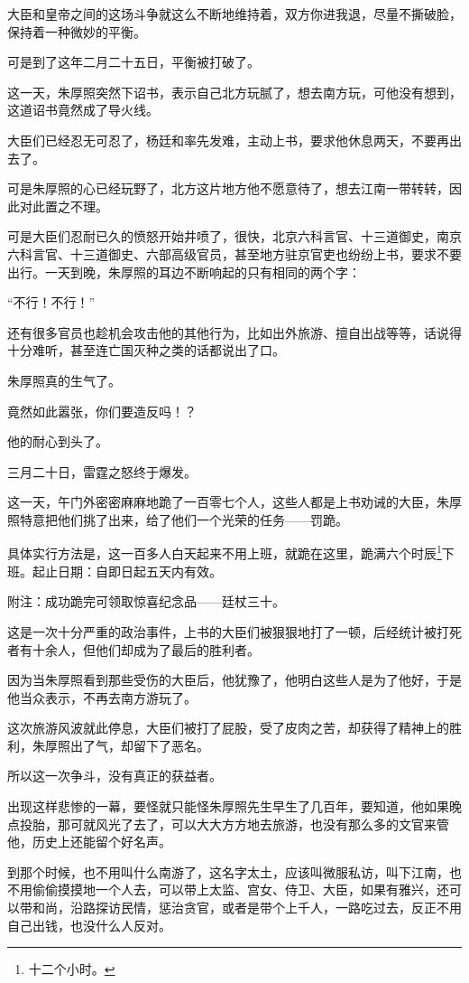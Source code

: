 \begin{multicols}{\theparacolNo}
大臣和皇帝之间的这场斗争就这么不断地维持着，双方你进我退，尽量不撕破脸，保持着一种微妙的平衡。

可是到了这年二月二十五日，平衡被打破了。

这一天，朱厚照突然下诏书，表示自己北方玩腻了，想去南方玩，可他没有想到，这道诏书竟然成了导火线。

大臣们已经忍无可忍了，杨廷和率先发难，主动上书，要求他休息两天，不要再出去了。

可是朱厚照的心已经玩野了，北方这片地方他不愿意待了，想去江南一带转转，因此对此置之不理。

可是大臣们忍耐已久的愤怒开始井喷了，很快，北京六科言官、十三道御史，南京六科言官、十三道御史、六部高级官员，甚至地方驻京官吏也纷纷上书，要求不要出行。一天到晚，朱厚照的耳边不断响起的只有相同的两个字：

“不行！不行！”

还有很多官员也趁机会攻击他的其他行为，比如出外旅游、擅自出战等等，话说得十分难听，甚至连亡国灭种之类的话都说出了口。

朱厚照真的生气了。

竟然如此嚣张，你们要造反吗！？

他的耐心到头了。

三月二十日，雷霆之怒终于爆发。

这一天，午门外密密麻麻地跪了一百零七个人，这些人都是上书劝诫的大臣，朱厚照特意把他们挑了出来，给了他们一个光荣的任务——罚跪。

具体实行方法是，这一百多人白天起来不用上班，就跪在这里，跪满六个时辰\footnote{十二个小时。}下班。起止日期：自即日起五天内有效。

附注：成功跪完可领取惊喜纪念品——廷杖三十。

这是一次十分严重的政治事件，上书的大臣们被狠狠地打了一顿，后经统计被打死者有十余人，但他们却成为了最后的胜利者。

因为当朱厚照看到那些受伤的大臣后，他犹豫了，他明白这些人是为了他好，于是他当众表示，不再去南方游玩了。

这次旅游风波就此停息，大臣们被打了屁股，受了皮肉之苦，却获得了精神上的胜利，朱厚照出了气，却留下了恶名。

所以这一次争斗，没有真正的获益者。

出现这样悲惨的一幕，要怪就只能怪朱厚照先生早生了几百年，要知道，他如果晚点投胎，那可就风光了去了，可以大大方方地去旅游，也没有那么多的文官来管他，历史上还能留个好名声。

到那个时候，也不用叫什么南游了，这名字太土，应该叫微服私访，叫下江南，也不用偷偷摸摸地一个人去，可以带上太监、宫女、侍卫、大臣，如果有雅兴，还可以带和尚，沿路探访民情，惩治贪官，或者是带个上千人，一路吃过去，反正不用自己出钱，也没什么人反对。


\end{multicols}
